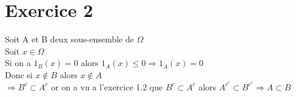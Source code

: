 \documentclass{article}
\author{Frederic Becerril}
\begin{document}
\part*{Exercice 2}

Soit A et B deux sous-ensemble de $\Omega$\\
Soit $x \in \Omega$\\
Si on a $1_B(x) = 0$ alors $1_A(x) \leq 0 \Rightarrow 1_A(x) = 0$\\
Donc si $x \notin B$ alors $x \notin A$\\
$\Rightarrow B^c \subset A^c$ or on a vu a l'exercice 1.2 que $B^c \subset A^c$ alors $A^{c^c} \subset B^{c^c} \Rightarrow A \subset B$ 
\end{document}
